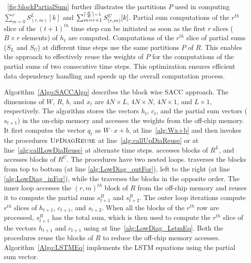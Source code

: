 \figurename{~\ref{fig:blockPartialSum}} further illustrates the partitions $P$ used in computing $\sum_{m{=}0}^{r}S_{(r,m)}^{L}[k]$ and $\sum_{m{=}r{+}1}^{\lceil\frac{N}{B}\rceil{-}1}S_{(r,m)}^{U}[k]$.
Partial sum computations of the $r^{th}$ slice of the $(t{+}1)^{th}$ time step can be initiated as soon as the first $r$ slices ($B{\times}r$ elements) of $h_t$ are computed. Computations of the $r^{th}$ slice of partial sums ($S_L$ and $S_U$) at different time steps use the same partitions $P$ of $R$. This enables the approach to effectively reuse the weights of $P$ for the computations of the partial sums of two consecutive time steps. This optimization ensures efficient data dependency handling and speeds up the overall computation process.

Algorithm~\ref{Algo:SACCAlgo} describes the block wise SACC approach. The dimensions of $W$, $R$, $b$, and $x_t$ are $4N{\times}L$, $4N{\times}N$, $4N{\times}1$, and $L{\times}1$, respectively. The algorithm stores the vectors $h_t$, $c_t$, and the partial sum vectors ($s_{t+1}$) in the on-chip memory and accesses the weights from the off-chip memory. It first computes the vector $q_t$ as $W{\cdot}x{+}b$, at line~\ref{alg:Wx+b} and then invokes the procedures $\textproc{UpDiagReuse}$ at line~\ref{alg:callUpDiaReuse} or   at line~\ref{alg:callLowDiaReuse} at alternate time steps.  accesses blocks of $R^L$, and  accesses blocks of $R^U$. The procedures have two nested loops.  traverses the blocks from top to bottom (at line \ref{alg:LowDiag_outFor}), left to the right (at line \ref{alg:LowDiag_inFor}), while the  traverses the blocks in the opposite order. The inner loop accesses the $(r,m)^{th}$ block of $R$ from the off-chip memory and reuses it to compute the partial sums $s^B_{t+1}$ and $s^B_{t+2}$. The outer loop iterations compute $r^{th}$ slices of $h_{t+1}$, $c_{t+1}$, and $s_{t+2}$.
When all the blocks of the $r^{th}$ row are processed, $s^B_{t+1}$ has the total sum, which is then used to compute the $r^{th}$ slice of the vectors $h_{t+1}$ and $c_{t+1}$ using  at line~\ref{alg:LowDiag_LstmEq}. 
Both the procedures reuse the blocks of $R$ to reduce the off-chip memory accesses. Algorithm~\ref{Algo:LSTMEq} implements the LSTM equations using the partial sum vector.


